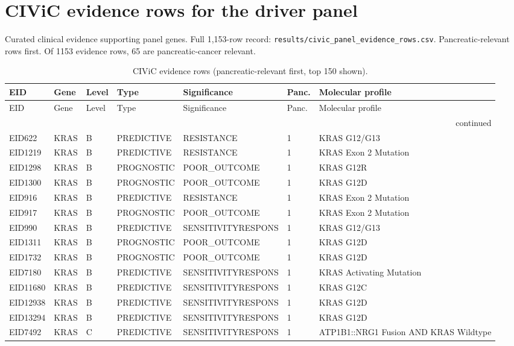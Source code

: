\section{CIViC evidence rows for the driver panel}
Curated clinical evidence supporting panel genes. Full 1{,}153-row record: \texttt{results/civic\_panel\_evidence\_rows.csv}. Pancreatic-relevant rows first.
Of 1153 evidence rows, 65 are pancreatic-cancer relevant.
\begin{footnotesize}\begin{longtable}{llllllp{4.2cm}}
\caption{CIViC evidence rows (pancreatic-relevant first, top 150 shown).}\\ \hline\hline
EID & Gene & Level & Type & Significance & Panc. & Molecular profile \\ \hline \endfirsthead
\hline\hline EID & Gene & Level & Type & Significance & Panc. & Molecular profile \\ \hline \endhead
\hline \multicolumn{7}{r}{continued}\\ \endfoot \hline\hline \endlastfoot
EID622 & KRAS & B & PREDICTIVE & RESISTANCE & 1 & KRAS G12/G13 \\
EID1219 & KRAS & B & PREDICTIVE & RESISTANCE & 1 & KRAS Exon 2 Mutation \\
EID1298 & KRAS & B & PROGNOSTIC & POOR\_OUTCOME & 1 & KRAS G12R \\
EID1300 & KRAS & B & PROGNOSTIC & POOR\_OUTCOME & 1 & KRAS G12D \\
EID916 & KRAS & B & PREDICTIVE & RESISTANCE & 1 & KRAS Exon 2 Mutation \\
EID917 & KRAS & B & PROGNOSTIC & POOR\_OUTCOME & 1 & KRAS Exon 2 Mutation \\
EID990 & KRAS & B & PREDICTIVE & SENSITIVITYRESPONS & 1 & KRAS G12/G13 \\
EID1311 & KRAS & B & PROGNOSTIC & POOR\_OUTCOME & 1 & KRAS G12D \\
EID1732 & KRAS & B & PROGNOSTIC & POOR\_OUTCOME & 1 & KRAS G12D \\
EID7180 & KRAS & B & PREDICTIVE & SENSITIVITYRESPONS & 1 & KRAS Activating Mutation \\
EID11680 & KRAS & B & PREDICTIVE & SENSITIVITYRESPONS & 1 & KRAS G12C \\
EID12938 & KRAS & B & PREDICTIVE & SENSITIVITYRESPONS & 1 & KRAS G12D \\
EID13294 & KRAS & B & PREDICTIVE & SENSITIVITYRESPONS & 1 & KRAS G12D \\
EID7492 & KRAS & C & PREDICTIVE & SENSITIVITYRESPONS & 1 & ATP1B1::NRG1 Fusion AND KRAS Wildtype \\

\end{longtable}
\end{footnotesize}
